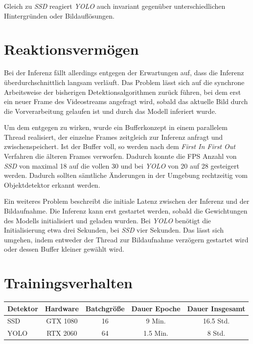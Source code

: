 Gleich zu \textit{SSD} reagiert \textit{YOLO} auch invariant gegenüber unterschiedlichen Hintergründen oder Bildauflösungen.
 
\section{Reaktionsvermögen}

Bei der Inferenz fällt allerdings entgegen der Erwartungen auf, dass die Inferenz überdurchschnittlich langsam verläuft. Das Problem lässt sich auf die synchrone Arbeitsweise der bisherigen Detektionsalgorithmen zurück führen, bei dem erst ein neuer Frame des Videostreams angefragt wird, sobald das aktuelle Bild durch die Vorverarbeitung gelaufen ist und durch das Modell inferiert wurde. 

Um dem entgegen zu wirken, wurde ein Bufferkonzept in einem parallelem Thread realisiert, der einzelne Frames zeitgleich zur Inferenz anfragt und zwischenspeichert. Ist der Buffer voll, so werden nach dem \textit{First In First Out} Verfahren die älteren Frames verworfen. Dadurch konnte die FPS Anzahl von \textit{SSD} von maximal 18 auf die vollen 30 und bei \textit{YOLO} von 20 auf 28 gesteigert werden. Dadurch sollten sämtliche Änderungen in der Umgebung rechtzeitig vom Objektdetektor erkannt werden. 

Ein weiteres Problem beschreibt die initiale Latenz zwischen der Inferenz und der Bildaufnahme. Die Inferenz kann erst gestartet werden, sobald die Gewichtungen des Modells initialisiert und geladen wurden. Bei \textit{YOLO} benötigt die Initialisierung etwa drei Sekunden, bei \textit{SSD} vier Sekunden. Das lässt sich umgehen, indem entweder der Thread zur Bildaufnahme verzögern gestartet wird oder dessen Buffer kleiner gewählt wird.

\section{Trainingsverhalten}

\begin{center}
	\begin{tabular}[H]{l|c|c|c|c}
		Detektor & Hardware & Batchgröße & Dauer Epoche & Dauer Insgesamt \\
		\hline
		SSD & GTX 1080 & 16 & 9 Min. & 16.5 Std. \\
		YOLO & RTX 2060 & 64 & 1.5 Min. & 8 Std.
	\end{tabular}
	\label{table:duration}
\end{center}

